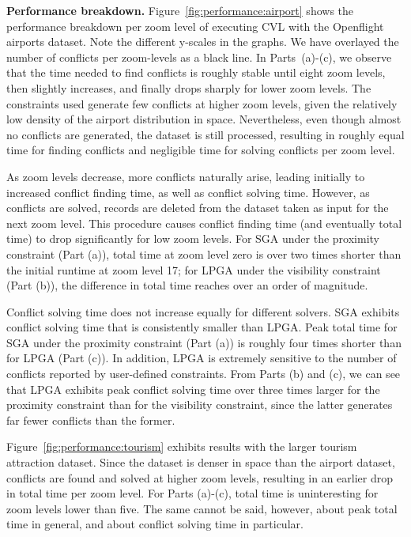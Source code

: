 \documentclass[11pt, oneside]{report}
\newcommand{\minisec}[1]{\noindent\textbf{#1.}}
\begin{document}
{\minisec{Performance breakdown}
Figure~\ref{fig:performance:airport} shows the performance breakdown per zoom level of executing CVL with the Openflight airports dataset. Note the different y-scales in the graphs. We have overlayed the number of conflicts per zoom-levels as a black line. In Parts~(a)-(c), we observe that the time needed to find conflicts is roughly stable until eight zoom levels, then slightly increases, and finally drops sharply for lower zoom levels. The constraints used generate few conflicts at higher zoom levels, given the relatively low density of the airport distribution in space. Nevertheless, even though almost no conflicts are generated, the dataset is still processed, resulting in roughly equal time for finding conflicts and negligible time for solving conflicts per zoom level. 
 
As zoom levels decrease, more conflicts naturally arise, leading initially to increased conflict finding time, as well as conflict solving time. However, as conflicts are solved, records are deleted from the dataset taken as input for the next zoom level. This procedure causes conflict finding time (and eventually total time) to drop significantly for low zoom levels. For SGA under the proximity constraint (Part (a)), total time at zoom level zero is over two times shorter than the initial runtime at zoom level 17; for LPGA under the visibility constraint (Part (b)), the difference in total time reaches over an order of magnitude.  

Conflict solving time does not increase equally for different solvers. SGA exhibits conflict solving time that is consistently smaller than LPGA. Peak total time for SGA under the proximity constraint (Part (a)) is roughly four times shorter than for LPGA (Part (c)). In addition, LPGA is extremely sensitive to the number of conflicts reported by user-defined constraints. From Parts (b) and (c), we can see that LPGA exhibits peak conflict solving time over three times larger for the proximity constraint than for the visibility constraint, since the latter generates far fewer conflicts than the former.

Figure~\ref{fig:performance:tourism} exhibits results with the larger tourism attraction dataset. Since the dataset is denser in space than the airport dataset, conflicts are found and solved at higher zoom levels, resulting in an earlier drop in total time per zoom level. For Parts (a)-(c), total time is uninteresting for zoom levels lower than five. The same cannot be said, however, about peak total time in general, and about conflict solving time in particular.

}
\end{document}
